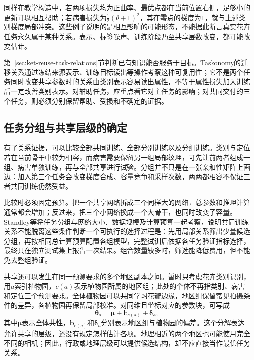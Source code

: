 同样在教学构造中，若两项损失均为正曲率、最优点都在当前位置右侧，足够小的更新可以相互帮助；若病害损失为$\tfrac12(\theta+1)^2$，其在零点的梯度为$1$，就与上述类别梯度局部冲突。这些例子说明的是相互影响的可能形态，不能据此断言真实花卉任务永久属于某种关系。表示、标签噪声、训练阶段乃至共享层数改变，都可能改变估计。

第~\ref{sec:ket-reuse-task-relations}节判断已有知识能否服务于目标。Taskonomy的迁移关系通过冻结来源表示、训练目标读出等操作考察这种可复用性；它不是两个任务同时改变共享参数时的关系由类别表示容易读出属性，不等于属性损失加入训练后一定改善类别表示。对辅助任务，应重点看它对主任务的影响；对共同交付的三个任务，则必须分别保留帮助、受损和不确定的证据。

\subsection{任务分组与共享层级的确定}
\label{sec:ket-sharing-grouping}

有了关系证据，可以比较全部共同训练、全部分别训练以及分组训练。类别与定位若在当前骨干中较为相容，而病害需要保留另一组局部纹理，可先让前两者组成一组、病害单独训练，再与全部共享进行试验。分组并不只是在一张亲和性矩阵上画边：加入第三个任务会改变梯度合成、容量竞争和采样次数，两两都相容不保证三者共同训练仍然受益。

比较时必须固定预算。把一个共享网络拆成三个同样大的网络，总参数和推理计算通常都会增加；反过来，把三个小网络换成一个大骨干，也同时改变了容量。Standley等将任务分组与网络大小、数据规模及计算预算一起考察，说明共同训练关系不能脱离这些条件判断一个可执行的选择过程是：先用局部关系筛出少量候选分组，再按相同总计算预算配置各组模型，完整试训后依据各任务验证指标选择，最终只在独立测试集上报告一次结果。组合数量较多时，筛选能降低费用，但不能免去整组验证。

共享还可以发生在同一预测要求的多个地区副本之间。暂时只考虑花卉类别识别，用$a$索引植物园，$c(a)$表示植物园所属的地区组；此处的个体不再指类别、病害和定位三个预测要求。全体植物园可以共同学习花瓣边缘，地区组保留常见拍摄条件的差异，各植物园再保留局部校准。对同维且坐标对应的参数块，可写成
\begin{equation}
  \bm{\theta}_a
  =\bm{\mu}+\bm b_{c(a)}+\bm\delta_a,
  \label{eq:ket-sharing-hierarchy}
\end{equation}
其中$\bm{\mu}$表示全体共性，$\bm b_{c(a)}$和$\bm\delta_a$分别表示地区组与植物园的偏差。这个分解表达允许共享的层级，还没有规定怎样估计各项。地理相近的两个地区也可能使用完全不同的相机；因此，行政或地理层级可以提供候选结构，却不应直接当作最优任务关系。


